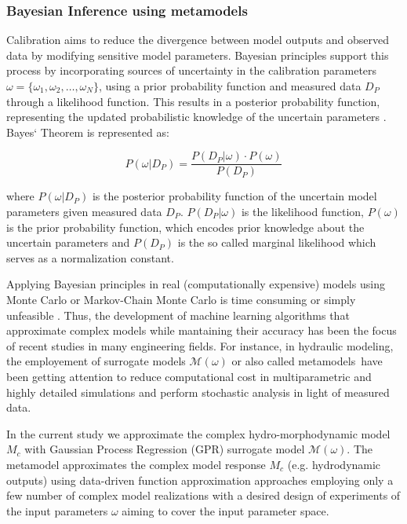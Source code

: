 \documentclass[draft,linenumbers,onecolumn]{agujournal2019} %
\begin{document}
\subsubsection{Bayesian Inference using metamodels}

Calibration aims to reduce the divergence between model outputs and observed data by modifying sensitive model parameters. Bayesian principles support this process by incorporating sources of uncertainty in the calibration parameters \( \omega = \{\omega_1, \omega_2, \ldots, \omega_N\} \), using a prior probability function and measured data  \(D_P\) through a likelihood function. This results in a posterior probability function, representing the updated probabilistic knowledge of the uncertain parameters \cite{smith1992bayesian,lim2017comprehensive}. Bayes` Theorem is represented as: 

\[
P(\omega | D_P) = \frac{P(D_P | \omega) \cdot P(\omega)}{P(D_P)}
\]

where \( P(\omega | D_P) \) is the posterior probability function of the uncertain model parameters given measured data \(D_P\). \(P(D_P | \omega)\)  is the likelihood function,  \( P(\omega) \) is the prior probability function, which encodes prior knowledge about the uncertain parameters and \( P(D_P) \) is the so called marginal likelihood which serves as a normalization constant.  


Applying Bayesian principles in real (computationally expensive) models using Monte Carlo or Markov-Chain Monte Carlo is time consuming or simply unfeasible \cite{smith1992bayesian,oladyshkin2020bayesian3}.
Thus, the development of machine learning algorithms that approximate complex models while mantaining their accuracy has been the focus of recent studies in many engineering fields. For instance, in hydraulic modeling, the employement of surrogate models \( \mathcal{M}(\omega) \)  or also called metamodels have been getting attention to reduce computational cost in  multiparametric and highly detailed simulations and perform stochastic analysis in light of measured data.


In the current study we approximate the complex hydro-morphodynamic model \( M_c \) with Gaussian Process Regression (GPR) surrogate model \( \mathcal{M}(\omega) \). The metamodel approximates the complex model response \( M_c \) (e.g. hydrodynamic outputs) using data-driven function approximation approaches \cite{razavi2012review} employing only a few number of complex model realizations with a desired design of experiments of the input parameters \(\omega\) aiming to cover the input parameter space. 
\end{document}
